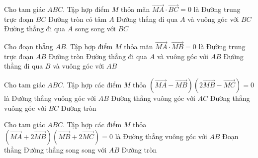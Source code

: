 \begin{ex}%
	Cho tam giác $ABC$. Tập hợp điểm $M$ thỏa mãn $\overrightarrow{MA}\cdot \overrightarrow{BC}=0$ là
	\choice
	{Đường trung trực đoạn $BC$}
	{Đường tròn có tâm $A$}
	{\True Đường thẳng đi qua $A$ và vuông góc với $BC$}
	{Đường thẳng đi qua $A$ song song với $BC$}
\end{ex}
\begin{ex}%
	Cho đoạn thẳng $AB$. Tập hợp điểm $M$ thỏa mãn $\overrightarrow{MA}\cdot \overrightarrow{MB}=0$ là
	\choice
	{Đường trung trực đoạn $AB$}
	{\True Đường tròn}
	{Đường thẳng đi qua $A$ và vuông góc với $AB$}
	{Đường thẳng đi qua $B$ và vuông góc với $AB$}
\end{ex}
\begin{ex}%
	Cho tam giác $ABC$. Tập hợp các điểm $M$ thỏa $\left( \overrightarrow{MA}-\overrightarrow{MB} \right)\left( 2\overrightarrow{MB}-\overrightarrow{MC} \right)=0$ là
	\choice
	{\True Đường thẳng vuông góc với $AB$}
	{Đường thẳng vuông góc với $AC$}
	{Đường thẳng vuông góc với $BC$}
	{Đường tròn}
\end{ex}
\begin{ex}%
	Cho tam giác $ABC$. Tập hợp các điểm $M$ thỏa $\left( \overrightarrow{MA}+2\overrightarrow{MB} \right)\left( \overrightarrow{MB}+2\overrightarrow{MC} \right)=0$ là
	\choice
	{Đường thẳng vuông góc với $AB$}
	{Đoạn thẳng}
	{Đường thẳng song song với $AB$}
	{\True Đường tròn}
\end{ex}

